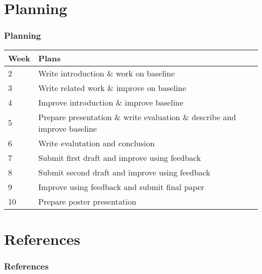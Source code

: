 \documentclass[handout]{beamer}
\begin{document}
\section{Planning}
\begin{frame}
\frametitle{Planning}
\begin{tabular}{| l | p{10cm} |}
    \hline
    Week & Plans \\ \hline
    2 & Write introduction \& work on baseline \\
    3 & Write related work \& improve on baseline \\
    4 & Improve introduction \& improve baseline \\
    5 & Prepare presentation \& write evaluation \& describe and improve baseline \\
    6 & Write evalutation and conclusion \\
    7 & Submit first draft and improve using feedback \\
    8 & Submit second draft and improve using feedback \\
    9 & Improve using feedback and submit final paper \\
    10 & Prepare poster presentation \\
    \hline
\end{tabular}
\end{frame}

\section{References}
\begin{frame}
\frametitle{References}
\printbibliography[heading=none]
\end{frame}
\end{document}
